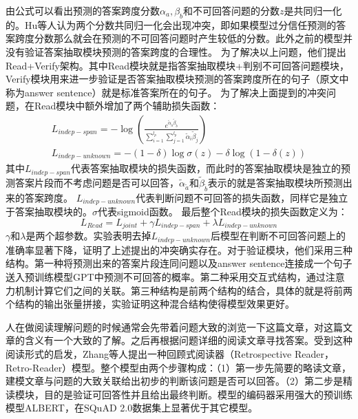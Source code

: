 由公式可以看出预测的答案跨度分数$\alpha_a,\beta_b$和不可回答问题的分数$z$是共同归一化的。Hu等人认为两个分数共同归一化会出现冲突，即如果模型过分信任预测的答案跨度分数那么就会在预测的不可回答问题时产生较低的分数。此外之前的模型并没有验证答案抽取模块预测的答案跨度的合理性。
为了解决以上问题，他们提出Read+Verify架构。其中Read模块就是指答案抽取模块+判别不可回答问题模块，
Verify模块用来进一步验证是否答案抽取模块预测的答案跨度所在的句子（原文中称为answer sentence）就是标准答案所在的句子。
为了解决上面提到的冲突问题，在Read模块中额外增加了两个辅助损失函数：
\begin{gather}
	L_{indep-span}=-\log(\displaystyle\frac{e^{\widetilde{\alpha}_{\widetilde{a}}\widetilde{\beta}_{\widetilde{b}}}}{\sum_{i=1}^{l_p}\sum_{j=1}^{l_p}\widetilde{\alpha}_{i}\widetilde{\beta}_{j}}) \\
	L_{indep-unknown}=-(1-\delta)\log\sigma(z)-\delta\log(1-\delta(z))
\end{gather}
其中$L_{indep-span}$代表答案抽取模块的损失函数，而此时的答案抽取模块是独立的预测答案片段而不考虑问题是否可以回答，$\widetilde{\alpha}_{\widetilde{a}}$和$\widetilde{\beta}_{\widetilde{b}}$表示的就是答案抽取模块所预测出来的答案跨度。
$L_{indep-unknown}$代表判断问题不可回答的损失函数，同样它是独立于答案抽取模块的。$\sigma$代表sigmoid函数。
最后整个Read模块的损失函数定义为：
\begin{equation}
	L_{Read}=L_{joint}+\gamma L_{indep-span}+\lambda L_{indep-unknown}
\end{equation}
$\gamma$和$\lambda$是两个超参数。实验表明去掉$L_{indep-unknown}$后模型在判断不可回答问题上的准确率显著下降，证明了上述提出的冲突确实存在。对于验证模块，他们采用三种结构。第一种将预测出来的答案片段连同问题以及answer sentence连接成一个句子送入预训练模型GPT中预测不可回答的概率。第二种采用交互式结构，通过注意力机制计算它们之间的关联。第三种结构是前两个结构的结合，具体的就是将前两个结构的输出张量拼接，实验证明这种混合结构使得模型效果更好。

人在做阅读理解问题的时候通常会先带着问题大致的浏览一下这篇文章，对这篇文章的含义有一个大致的了解。之后再根据问题详细的阅读文章寻找答案。受到这种阅读形式的启发，Zhang等人提出一种回顾式阅读器（Retrospective Reader，Retro-Reader）模型。整个模型由两个步骤构成：（1）第一步先简要的略读文章，建模文章与问题的大致关联给出初步的判断该问题是否可以回答。（2）第二步是精读模块，目的是验证可回答性并且给出最终判断。模型的编码器采用强大的预训练模型ALBERT，在SQuAD 2.0数据集上显著优于其它模型。


